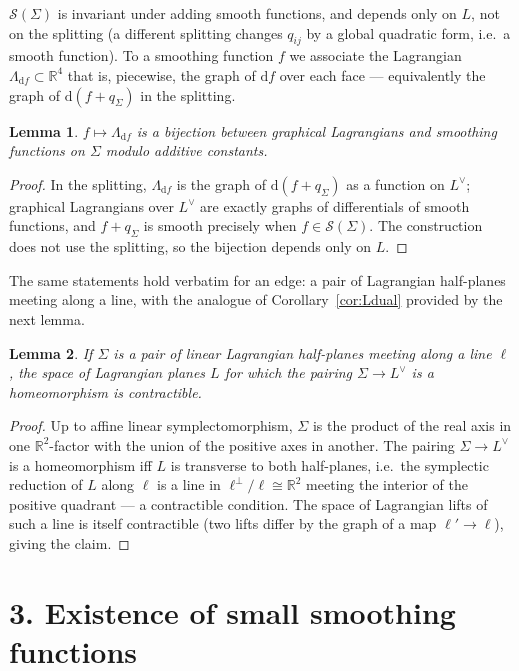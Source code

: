 \documentclass[11pt]{article}
\newcommand{\R}{\mathbb{R}}
\newcommand{\Sm}{\mathscr S}
\newcommand{\Ldual}{L^{\vee}}
\newcommand{\dd}{\mathrm d}
\newcommand{\Lag}{\Lambda}
\newtheorem{lemma}{Lemma}
\theoremstyle{definition}
\begin{document}
$\Sm(\Sigma)$ is invariant under adding smooth functions, and depends only on
$L$, not on the splitting (a different splitting changes $q_{ij}$ by a global
quadratic form, i.e.\ a smooth function). To a smoothing function $f$ we
associate the Lagrangian $\Lag_{\dd f}\subset\R^4$ that is, piecewise, the graph
of $\dd f$ over each face — equivalently the graph of $\dd(f+q_\Sigma)$ in the
splitting.

\begin{lemma}\label{lem:bijection}
$f\mapsto \Lag_{\dd f}$ is a bijection between graphical Lagrangians and
smoothing functions on $\Sigma$ modulo additive constants.
\end{lemma}

\begin{proof}
In the splitting, $\Lag_{\dd f}$ is the graph of $\dd(f+q_\Sigma)$ as a function
on $\Ldual$; graphical Lagrangians over $\Ldual$ are exactly graphs of
differentials of smooth functions, and $f+q_\Sigma$ is smooth precisely when
$f\in\Sm(\Sigma)$. The construction does not use the splitting, so the bijection
depends only on $L$.
\end{proof}

\noindent The same statements hold verbatim for an edge: a pair of Lagrangian
half-planes meeting along a line, with the analogue of
Corollary~\ref{cor:Ldual} provided by the next lemma.

\begin{lemma}\label{lem:edge}
If $\Sigma$ is a pair of linear Lagrangian half-planes meeting along a line
$\ell$, the space of Lagrangian planes $L$ for which the pairing
$\Sigma\to\Ldual$ is a homeomorphism is contractible.
\end{lemma}

\begin{proof}
Up to affine linear symplectomorphism, $\Sigma$ is the product of the real axis
in one $\R^2$-factor with the union of the positive axes in another. The pairing
$\Sigma\to\Ldual$ is a homeomorphism iff $L$ is transverse to both half-planes,
i.e.\ the symplectic reduction of $L$ along $\ell$ is a line in $\ell^\perp/\ell\cong\R^2$
meeting the interior of the positive quadrant — a contractible condition. The
space of Lagrangian lifts of such a line is itself contractible (two lifts differ
by the graph of a map $\ell'\to\ell$), giving the claim.
\end{proof}

\section*{3. Existence of small smoothing functions}
\end{document}
